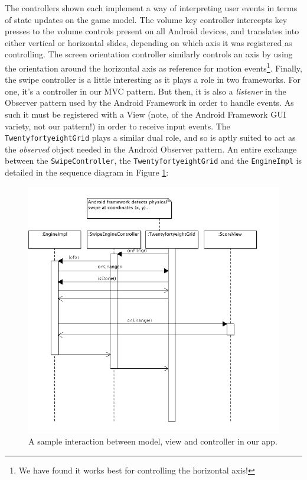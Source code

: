 \documentclass[a4paper, 12pt]{article}
\newcommand{\code}[1]{\texttt{#1}}
\begin{document}
The controllers shown each implement a way of interpreting user events
in terms of state updates on the game model. The volume key controller
intercepts key presses to the volume controls present on all Android
devices, and translates into either vertical or horizontal slides,
depending on which axis it was registered as controlling. The screen
orientation controller similarly controls an axis by using the
orientation around the horizontal axis as reference for motion
events\footnote{We have found it works best for controlling the
  horizontal axis!}. Finally, the swipe controller is a little
interesting as it plays a role in two frameworks. For one, it's a
controller in our MVC pattern. But then, it is also a \emph{listener}
in the Observer pattern used by the Android Framework in order to
handle events. As such it must be registered with a View (note, of the
Android Framework GUI variety, not our pattern!) in order to receive
input events. The \code{TwentyfortyeightGrid} plays a similar dual
role, and so is aptly suited to act as the \emph{observed} object
needed in the Android Observer pattern. An entire exchange between the
\code{SwipeController}, the \code{TwentyfortyeightGrid} and the
\code{EngineImpl} is detailed in the sequence diagram in Figure
\ref{fig:seq-1.png}:

\begin{figure}[!h]
  \includegraphics[width=\linewidth]{seq-1.png}
  \caption{A sample interaction between model, view and controller in
    our app.}
  \label{fig:seq-1.png}
\end{figure}
\end{document}
